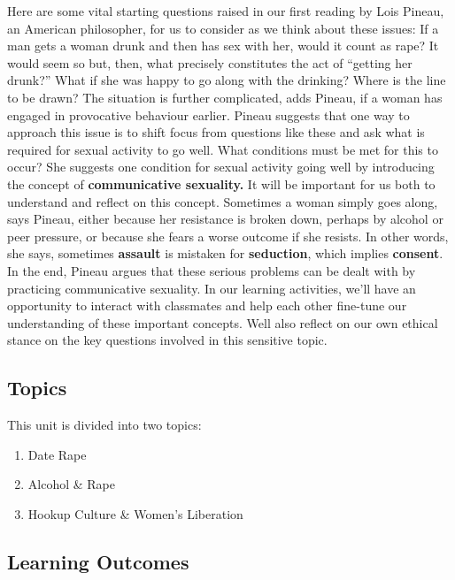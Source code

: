 \documentclass[
]{book}
\providecommand{\tightlist}{%
  \setlength{\itemsep}{0pt}\setlength{\parskip}{0pt}}
\begin{document}
Here are some vital starting questions raised in our first reading by Lois Pineau, an American philosopher, for us to consider as we think about these issues: If a man gets a woman drunk and then has sex with her, would it count as rape? It would seem so but, then, what precisely constitutes the act of ``getting her drunk?'' What if she was happy to go along with the drinking? Where is the line to be drawn? The situation is further complicated, adds Pineau, if a woman has engaged in provocative behaviour earlier.
Pineau suggests that one way to approach this issue is to shift focus from questions like these and ask what is required for sexual activity to go well. What conditions must be met for this to occur? She suggests one condition for sexual activity going well by introducing the concept of \textbf{communicative sexuality.} It will be important for us both to understand and reflect on this concept.
Sometimes a woman simply goes along, says Pineau, either because her resistance is broken down, perhaps by alcohol or peer pressure, or because she fears a worse outcome if she resists. In other words, she says, sometimes \textbf{assault} is mistaken for \textbf{seduction}, which implies \textbf{consent}. In the end, Pineau argues that these serious problems can be dealt with by practicing communicative sexuality.
In our learning activities, we'll have an opportunity to interact with classmates and help each other fine-tune our understanding of these important concepts. Well also reflect on our own ethical stance on the key questions involved in this sensitive topic.

\hypertarget{topics-5}{%
\subsection*{Topics}\label{topics-5}}

This unit is divided into two topics:

\begin{enumerate}
\def\labelenumi{\arabic{enumi}.}
\tightlist
\item
  Date Rape\\
\item
  Alcohol \& Rape\\
\item
  Hookup Culture \& Women's Liberation
\end{enumerate}

\hypertarget{learning-outcomes-5}{%
\subsection*{Learning Outcomes}\label{learning-outcomes-5}}
\end{document}
